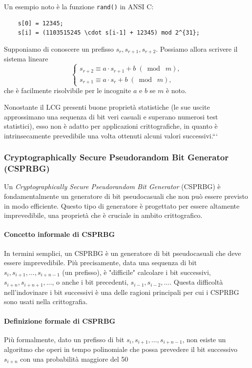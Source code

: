 \documentclass{report}
\begin{document}
Un esempio noto è la funzione \texttt{rand()} in ANSI C:
\begin{verbatim}
    s[0] = 12345;
    s[i] = (1103515245 \cdot s[i-1] + 12345) mod 2^{31};
\end{verbatim}

Supponiamo di conoscere un prefisso \(s_r, s_{r+1}, s_{r+2}\). Possiamo allora scrivere il sistema lineare
\[
\begin{cases}
s_{r+2} \equiv a\cdot s_{r+1} + b \;(\bmod\;m),\\
s_{r+1} \equiv a\cdot s_{r}   + b \;(\bmod\;m),
\end{cases}
\]
che è facilmente risolvibile per le incognite \(a\) e \(b\) se \(m\) è noto.

Nonostante il LCG presenti buone proprietà statistiche (le sue uscite approssimano una sequenza di bit veri casuali e superano numerosi test statistici), esso non è adatto per applicazioni crittografiche, in quanto è intrinsecamente prevedibile una volta ottenuti alcuni valori successivi.```
\subsubsection{Cryptographically Secure Pseudorandom Bit Generator (CSPRBG)}

Un \emph{Cryptographically Secure Pseudorandom Bit Generator} (CSPRBG) è fondamentalmente un generatore di bit pseudocasuali che non può essere previsto in modo efficiente. Questo tipo di generatore è progettato per essere altamente imprevedibile, una proprietà che è cruciale in ambito crittografico.

\paragraph{Concetto informale di CSPRBG}
In termini semplici, un CSPRBG è un generatore di bit pseudocasuali che deve essere imprevedibile. Più precisamente, data una sequenza di bit \( s_i, s_{i+1}, \dots, s_{i+n-1} \) (un prefisso), è "difficile" calcolare i bit successivi, \( s_{i+n}, s_{i+n+1}, \dots \), o anche i bit precedenti, \( s_{i-1}, s_{i-2}, \dots \). Questa difficoltà nell'indovinare i bit successivi è una delle ragioni principali per cui i CSPRBG sono usati nella crittografia.

\paragraph{Definizione formale di CSPRBG}
Più formalmente, dato un prefisso di bit \( s_i, s_{i+1}, \dots, s_{i+n-1} \), non esiste un algoritmo che operi in tempo polinomiale che possa prevedere il bit successivo \( s_{i+n} \) con una probabilità maggiore del 50%
\end{document}
